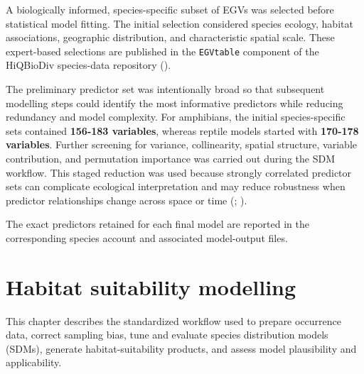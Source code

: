 \documentclass[
  openany]{book}
\let\OldTexttt\texttt
\renewcommand{\texttt}[1]{%
  \OldTexttt{\small #1}%
}
\begin{document}
A biologically informed, species-specific subset of EGVs was selected before statistical model fitting. The initial selection considered species ecology, habitat associations, geographic distribution, and characteristic spatial scale. These expert-based selections are published in the \texttt{EGVtable} component of the HiQBioDiv species-data repository ().

The preliminary predictor set was intentionally broad so that subsequent modelling steps could identify the most informative predictors while reducing redundancy and model complexity. For amphibians, the initial species-specific sets contained \textbf{156-183 variables}, whereas reptile models started with \textbf{170-178 variables}. Further screening for variance, collinearity, spatial structure, variable contribution, and permutation importance was carried out during the SDM workflow. This staged reduction was used because strongly correlated predictor sets can complicate ecological interpretation and may reduce robustness when predictor relationships change across space or time (; ).

The exact predictors retained for each final model are reported in the corresponding species account and associated model-output files.

\section{Habitat suitability modelling}\label{sdms}

This chapter describes the standardized workflow used to prepare occurrence data, correct sampling bias, tune and evaluate species distribution models (SDMs), generate habitat-suitability products, and assess model plausibility and applicability.
\end{document}
